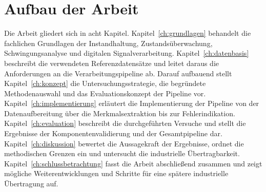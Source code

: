 \section{Aufbau der Arbeit}
\label{sec:aufbau}

Die Arbeit gliedert sich in acht Kapitel.
Kapitel~\ref{ch:grundlagen} behandelt die fachlichen Grundlagen der Instandhaltung,
Zustandsüberwachung, Schwingungsanalyse und digitalen Signalverarbeitung.
Kapitel~\ref{ch:datenbasis} beschreibt die verwendeten Referenzdatensätze
und leitet daraus die Anforderungen an die Verarbeitungspipeline ab.
Darauf aufbauend stellt Kapitel~\ref{ch:konzept}
die Untersuchungsstrategie, die begründete Methodenauswahl
und das Evaluationskonzept der Pipeline vor.
Kapitel~\ref{ch:implementierung} erläutert die Implementierung der Pipeline
von der Datenaufbereitung über die Merkmalsextraktion bis zur Fehlerindikation.
Kapitel~\ref{ch:evaluation} beschreibt die durchgeführten Versuche
und stellt die Ergebnisse der Komponentenvalidierung und der Gesamtpipeline dar.
Kapitel~\ref{ch:diskussion} bewertet die Aussagekraft der Ergebnisse,
ordnet die methodischen Grenzen ein und untersucht die industrielle Übertragbarkeit.
Kapitel~\ref{ch:schlussbetrachtung} fasst die Arbeit abschließend zusammen
und zeigt mögliche Weiterentwicklungen und Schritte
für eine spätere industrielle Übertragung auf.
